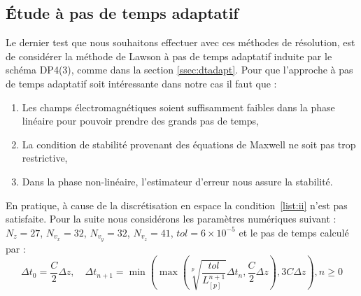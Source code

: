 \subsection{Étude à pas de temps adaptatif}

Le dernier test que nous souhaitons effectuer avec ces méthodes de résolution, est de considérer la méthode de Lawson à pas de temps adaptatif induite par le schéma DP4(3), comme dans la section \ref{ssec:dtadapt}. Pour que l'approche à pas de temps adaptatif soit intéressante dans notre cas il faut que :
\begin{enumerate}[label=(\roman*)]
  \item Les champs électromagnétiques soient suffisamment faibles dans la phase linéaire pour pouvoir prendre des grands pas de temps,\label{list:i}
  \item La condition de stabilité provenant des équations de Maxwell ne soit pas trop restrictive,\label{list:ii}
  \item Dans la phase non-linéaire, l'estimateur d'erreur nous assure la stabilité.\label{list:iii}
\end{enumerate}
En pratique, à cause de la discrétisation en espace la condition~\ref{list:ii} n'est pas satisfaite. Pour la suite nous considérons les paramètres numériques suivant : $N_z=27$, $N_{v_x}=32$, $N_{v_y}=32$, $N_{v_z}=41$, $tol=6\times10^{-5}$ et le pas de temps calculé par :
$$
  \Delta t_0 = \frac{C}{2}\Delta z,\quad \Delta t_{n+1} = \min\left( \max\left( \sqrt[p]{\frac{tol}{L_{[p]}^{n+1}}}\Delta t_n ,\frac{C}{2}\Delta z \right) , 3C\Delta z \right), n\geq 0
$$
